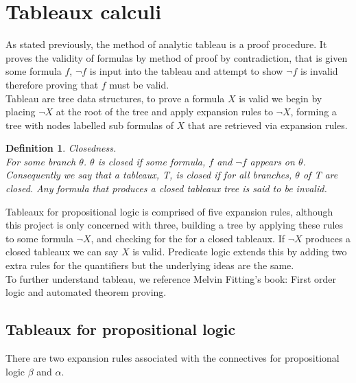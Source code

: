 \documentclass{article}%
\newtheorem{definition}{Definition}
\begin{document}
\section{Tableaux calculi}
As stated previously, the method of analytic tableau is a proof procedure. It proves the validity of formulas by method of proof by contradiction, that is given some formula $f$, $\neg{f}$ is input into the tableau and attempt to show $\neg{f}$ is invalid therefore proving that $f$ must be valid.\\ 
Tableau are tree data structures, to prove a formula $X$ is valid we begin by placing $\neg{X}$ at the root of the tree and apply expansion rules to $\neg{X}$, forming a tree with nodes labelled sub formulas of $X$ that are retrieved via expansion rules. 
\begin{definition}
Closedness.\\
For some branch $\theta$. $\theta$ is closed if some formula, $f$ and $\neg{f}$ appears on $\theta$. Consequently we say that a tableaux, T, is closed if for all branches, $\theta$ of T are closed. Any formula that produces a closed tableaux tree is said to be invalid. 
\end{definition}
Tableaux for propositional logic is comprised of five expansion rules, although this project is only concerned with three, building a tree by applying these rules to some formula $\neg{X}$, and checking for the for a closed tableaux. If $\neg{X}$ produces a closed tableaux we can say $X$ is valid. Predicate logic extends this by adding two extra rules for the quantifiers but the underlying ideas are the same. \\
To further understand tableau, we reference Melvin Fitting's book: First order logic and automated theorem proving. 

\subsection{Tableaux for propositional logic}
There are two expansion rules associated with the connectives for propositional logic $\beta$ and $\alpha$.
\end{document}
